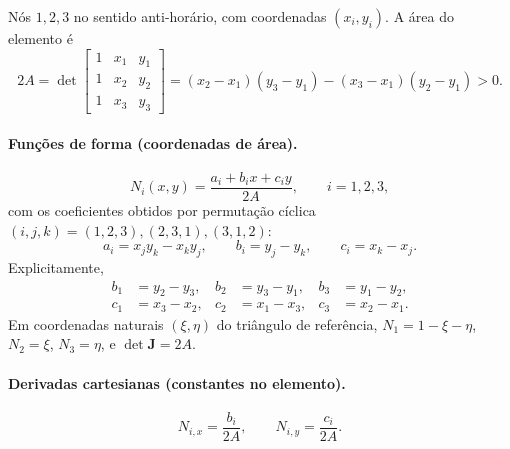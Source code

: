 \documentclass[11pt,a4paper]{article}
\begin{document}
Nós $1,2,3$ no sentido anti-horário, com coordenadas $(x_i,y_i)$.
A área do elemento é
\begin{equation*}
2A=\det\begin{bmatrix}1&x_1&y_1\\1&x_2&y_2\\1&x_3&y_3\end{bmatrix}
=(x_2-x_1)(y_3-y_1)-(x_3-x_1)(y_2-y_1)>0.
\end{equation*}

\paragraph{Funções de forma (coordenadas de área).}
\begin{equation*}
\boxed{N_i(x,y)=\frac{a_i+b_ix+c_iy}{2A},\qquad i=1,2,3,}
\end{equation*}
com os coeficientes obtidos por permutação cíclica $(i,j,k)=(1,2,3),(2,3,1),(3,1,2)$:
\begin{equation*}
\boxed{a_i=x_jy_k-x_ky_j,\qquad b_i=y_j-y_k,\qquad c_i=x_k-x_j.}
\end{equation*}
Explicitamente,
\begin{align*}
b_1&=y_2-y_3, & b_2&=y_3-y_1, & b_3&=y_1-y_2,\\
c_1&=x_3-x_2, & c_2&=x_1-x_3, & c_3&=x_2-x_1.
\end{align*}
Em coordenadas naturais $(\xi,\eta)$ do triângulo de referência,
$N_1=1-\xi-\eta$, $N_2=\xi$, $N_3=\eta$, e $\det\mathbf J=2A$.

\paragraph{Derivadas cartesianas (constantes no elemento).}
\begin{equation*}
N_{i,x}=\frac{b_i}{2A},\qquad N_{i,y}=\frac{c_i}{2A}.
\end{equation*}
\end{document}
